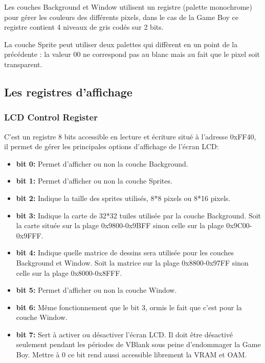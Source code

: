 \documentclass{report}
\begin{document}
Les couches Background et Window utilisent un registre (palette monochrome) pour gérer les
couleurs des différents pixels, dans le cas de la Game Boy ce registre contient
4 niveaux de gris codés sur 2 bits.

La couche Sprite peut utiliser deux palettes qui diffèrent en un point de la précédente : la valeur 00 ne correspond pas au blanc mais au fait que
le pixel soit transparent.\\

\subsection{Les registres d'affichage}
\subsubsection{LCD Control Register}
C'est un registre 8 bits accessible en lecture et écriture situé à l'adresse 0xFF40, il permet de gérer les principales options d'affichage de l'écran LCD:\\

\begin{itemize}
\item \textbf{bit 0:}
	Permet d'afficher ou non la couche Background.\\
\item \textbf{bit 1:}
	Permet d'afficher ou non la couche Sprites.\\
\item \textbf{bit 2:}
	Indique la taille des sprites utilisés, 8*8 pixels ou 8*16 pixels.\\
\item \textbf{bit 3:}
	Indique la carte de 32*32 tuiles utilisée par la couche Background. Soit la carte située sur la plage 0x9800-0x9BFF sinon celle sur la plage 0x9C00-0x9FFF.\\
\item \textbf{bit 4:}
	Indique quelle matrice de dessins sera utilisée pour les couches Background et Window. Soit la matrice sur la plage 0x8800-0x97FF sinon celle sur la plage 0x8000-0x8FFF.\\
\item \textbf{bit 5:}
	Permet d'afficher ou non la couche Window.\\
\item \textbf{bit 6:}
	Même fonctionnement que le bit 3, ormis le fait que c'est pour la couche Window.\\
\item \textbf{bit 7:}
	Sert à activer ou désactiver l'écran LCD. Il doit être désactivé seulement pendant les périodes de VBlank sous peine d'endommager la Game Boy. Mettre à 0 ce bit rend aussi accessible librement la VRAM et OAM.\\
\end{itemize}
\end{document}

